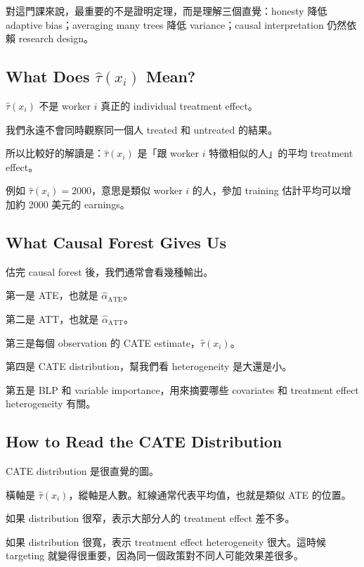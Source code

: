 \documentclass[
  chinese,
  11pt,
]{article}
\begin{document}
對這門課來說，最重要的不是證明定理，而是理解三個直覺：honesty 降低
adaptive bias；averaging many trees 降低 variance；causal interpretation
仍然依賴 research design。

\subsection{\texorpdfstring{What Does \(\hat{\tau}(x_i)\)
Mean?}{What Does \textbackslash hat\{\textbackslash tau\}(x\_i) Mean?}}\label{what-does-hattaux_i-mean}

\(\hat{\tau}(x_i)\) 不是 worker \(i\) 真正的 individual treatment
effect。

我們永遠不會同時觀察同一個人 treated 和 untreated 的結果。

所以比較好的解讀是：\(\hat{\tau}(x_i)\) 是「跟 worker \(i\)
特徵相似的人」的平均 treatment effect。

例如 \(\hat{\tau}(x_i)=2000\)，意思是類似 worker \(i\) 的人，參加
training 估計平均可以增加約 2000 美元的 earnings。

\subsection{What Causal Forest Gives
Us}\label{what-causal-forest-gives-us}

估完 causal forest 後，我們通常會看幾種輸出。

第一是 ATE，也就是 \(\hat{\alpha}_{\text{ATE}}\)。

第二是 ATT，也就是 \(\hat{\alpha}_{\text{ATT}}\)。

第三是每個 observation 的 CATE estimate，\(\hat{\tau}(x_i)\)。

第四是 CATE distribution，幫我們看 heterogeneity 是大還是小。

第五是 BLP 和 variable importance，用來摘要哪些 covariates 和 treatment
effect heterogeneity 有關。

\subsection{How to Read the CATE
Distribution}\label{how-to-read-the-cate-distribution}

CATE distribution 是很直覺的圖。

橫軸是 \(\hat{\tau}(x_i)\)，縱軸是人數。紅線通常代表平均值，也就是類似
ATE 的位置。

如果 distribution 很窄，表示大部分人的 treatment effect 差不多。

如果 distribution 很寬，表示 treatment effect heterogeneity 很大。這時候
targeting 就變得很重要，因為同一個政策對不同人可能效果差很多。
\end{document}
